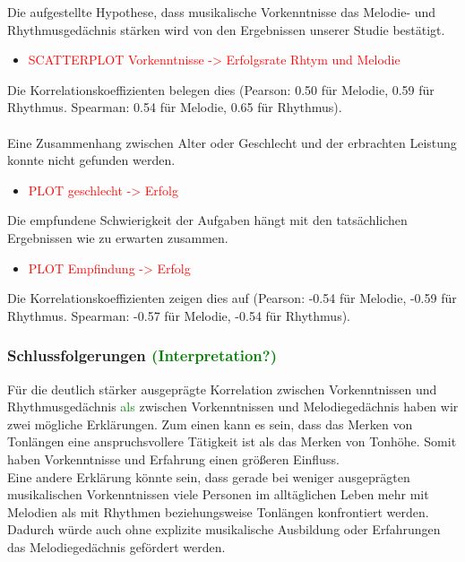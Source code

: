 \documentclass{acm_proc_article-sp}
\begin{document}
Die aufgestellte Hypothese, dass musikalische Vorkenntnisse das Melodie- und Rhythmusgedächnis stärken wird von den Ergebnissen unserer Studie bestätigt.
\begin{itemize} 
\item \textcolor{red}{SCATTERPLOT Vorkenntnisse -> Erfolgsrate Rhtym und Melodie}
\end{itemize}
Die Korrelationskoeffizienten belegen dies (Pearson: 0.50 für Melodie, 0.59 für Rhythmus. Spearman: 0.54 für Melodie, 0.65 für Rhythmus).\\\\

Eine Zusammenhang zwischen Alter oder Geschlecht und der erbrachten Leistung konnte nicht gefunden werden.
\begin{itemize} 
\item \textcolor{red}{PLOT geschlecht -> Erfolg}
\end{itemize}

Die empfundene Schwierigkeit der Aufgaben hängt mit den tatsächlichen Ergebnissen wie zu erwarten zusammen.
\begin{itemize} 
\item \textcolor{red}{PLOT Empfindung -> Erfolg}
\end{itemize}
Die Korrelationskoeffizienten zeigen dies auf (Pearson: -0.54 für Melodie, -0.59 für Rhythmus. Spearman: -0.57 für Melodie, -0.54 für Rhythmus).

\subsubsection{Schlussfolgerungen \textcolor{green}{(Interpretation?)}}
Für die deutlich stärker ausgeprägte Korrelation zwischen Vorkenntnissen und Rhythmusgedächnis \textcolor{green}{als} zwischen Vorkenntnissen und Melodiegedächnis haben wir zwei mögliche Erklärungen. Zum einen kann es sein, dass das Merken von Tonlängen eine anspruchsvollere Tätigkeit ist als das Merken von Tonhöhe. Somit haben Vorkenntnisse und Erfahrung einen größeren Einfluss. \\
Eine andere Erklärung könnte sein, dass gerade bei weniger ausgeprägten musikalischen Vorkenntnissen viele Personen im alltäglichen Leben mehr mit Melodien als mit Rhythmen beziehungsweise Tonlängen konfrontiert werden. Dadurch würde auch ohne explizite musikalische Ausbildung oder Erfahrungen das Melodiegedächnis gefördert werden.\\
\end{document}
